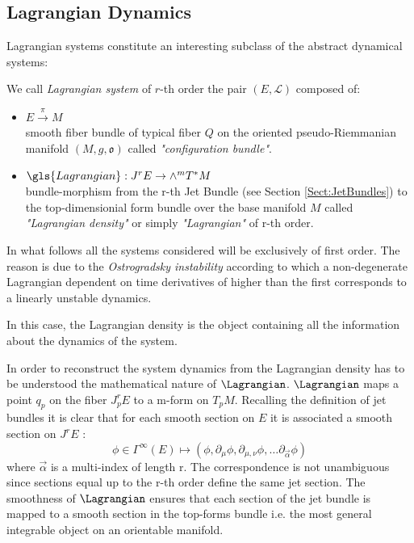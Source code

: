 \documentclass[Main]{subfiles}
\begin{document}
	\subsection{Lagrangian Dynamics}	
	Lagrangian systems constitute an interesting subclass of the abstract dynamical systems:
		\begin{definition}
			We call \emph{Lagrangian system} of $r$-th order the
			pair $(E, \mathcal{L} )$ composed of:
			\begin{itemize}
				\item $E \xrightarrow{\pi} M$ \\smooth fiber bundle of typical fiber $Q$ on the oriented pseudo-Riemmanian manifold $(M,g,\mathfrak{o})$ called \emph{"configuration bundle"}.
				\item	$ \gls{Lagrangian} : J^r E \rightarrow \wedge^m T^*M$ \\bundle-morphism from the r-th Jet Bundle (see Section \ref{Sect:JetBundles}) to  the top-dimensionial form bundle over the base manifold $M$  called \emph{"Lagrangian density"} or simply \emph{"Lagrangian"} of r-th order.
			\end{itemize}
		\end{definition}	
	
	\begin{NB}
	
		In what follows all the systems considered will be exclusively of first order.
		The reason is due to the \emph{Ostrogradsky instability} according to which a non-degenerate Lagrangian dependent on time derivatives of higher than the first corresponds to a linearly unstable dynamics.\cite{Motohashi2014}
	\end{NB}	
	
	
	In this case, the Lagrangian density is the object containing all the information about the dynamics of the system.

	In order to reconstruct the system dynamics from the Lagrangian density has to be understood the mathematical nature of $\Lagrangian$.
	$\Lagrangian$ maps a point $q_p$ on the fiber $J^r_p E$ to a m-form on $T_p M$.
	Recalling the definition of jet bundles it is clear that for each smooth section on $E$ it is associated a smooth section on $J^rE$ :
	\begin{displaymath}
		\phi \in \Gamma^\infty (E) \mapsto (\phi, \partial_\mu \phi, \partial_{\mu, \nu} \phi , \ldots \partial_{\vec{\alpha}}\phi)
	\end{displaymath}
	where  $\vec{\alpha}$ is a multi-index of length r.
	The correspondence is not unambiguous since sections equal up to the r-th order define the same jet section.
	The smoothness of $\Lagrangian$ ensures that each section of the jet bundle is mapped to a smooth section in the top-forms bundle i.e. the most general integrable object on an orientable manifold.
	
\end{document}
